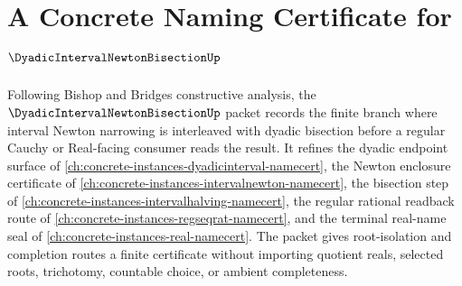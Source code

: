 \chapter{A Concrete Naming Certificate for $\DyadicIntervalNewtonBisectionUp$}
\label{ch:concrete-instances-dyadic-interval-newton-bisection-namecert}

Following Bishop and Bridges constructive analysis, the $\DyadicIntervalNewtonBisectionUp$ packet records the finite branch where interval Newton narrowing is interleaved with dyadic bisection before a regular Cauchy or Real-facing consumer reads the result. It refines the dyadic endpoint surface of \autoref{ch:concrete-instances-dyadicinterval-namecert}, the Newton enclosure certificate of \autoref{ch:concrete-instances-intervalnewton-namecert}, the bisection step of \autoref{ch:concrete-instances-intervalhalving-namecert}, the regular rational readback route of \autoref{ch:concrete-instances-regseqrat-namecert}, and the terminal real-name seal of \autoref{ch:concrete-instances-real-namecert}. The packet gives root-isolation and completion routes a finite certificate without importing quotient reals, selected roots, trichotomy, countable choice, or ambient completeness.

